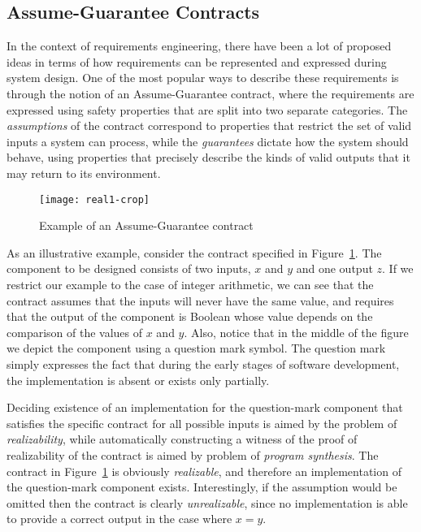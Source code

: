 \subsection{Assume-Guarantee Contracts}

In the context of requirements engineering, there have been a lot of proposed
ideas in terms of how requirements can be represented and expressed during
system design. 
One of the most popular ways to describe these requirements is through
the notion of an Assume-Guarantee contract, where the requirements are expressed
using safety properties that are split into two separate categories. The
\emph{assumptions} of the contract correspond to properties that restrict the
set of valid inputs a system can process, while the \emph{guarantees} dictate
how the system should behave, using properties that precisely describe
the kinds of valid outputs that it may return to its environment.

\begin{figure}[t!]
	\centering
	\texttt{[image: real1-crop]}    	
	\caption{Example of an Assume-Guarantee contract}
	\label{fg:example}
\end{figure}

As an illustrative example, consider the contract specified in
Figure~\ref{fg:example}. The component to be designed consists of two inputs,
$x$ and $y$ and one output $z$. If we restrict our example to the case of integer arithmetic,
we can see that the contract assumes that the inputs will never have the same value,
and requires that the output of the component is Boolean 
whose value depends on the comparison of the values of $x$ and $y$.
Also, notice that in the middle of the figure we depict the component using a
question mark symbol. The question mark simply expresses the fact that during
the early stages of software development, the implementation is absent or exists only partially.

Deciding existence of an implementation for the question-mark component 
that satisfies the specific contract for all possible inputs is aimed by the problem of 
\emph{realizability}, while automatically constructing a witness  of the proof 
of realizability of the contract is aimed by problem of \emph{program synthesis}.
The contract in Figure~\ref{fg:example} is obviously
\emph{realizable}, and therefore an implementation of the question-mark component exists.
Interestingly, if the assumption would be omitted then 
the contract is clearly \emph{unrealizable}, since no implementation 
is able to provide a correct output in the case where $x=y$.


